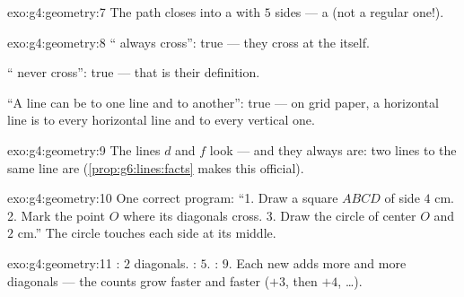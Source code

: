\begin{solution}{exo:g4:geometry:7}
The path closes into a  with $5$ sides --- a  (not a
regular one!).
\end{solution}

\begin{solution}{exo:g4:geometry:8}
`` always cross'': true --- they cross at the
 itself.

`` never cross'': true --- that is their definition.

``A line can be  to one line and  to
another'': true --- on grid paper, a horizontal line is  to
every horizontal line and  to every vertical one.
\end{solution}

\begin{solution}{exo:g4:geometry:9}
The lines $d$ and $f$ look  --- and they always are: two
lines  to the same line are 
(\cref{prop:g6:lines:facts} makes this official).
\end{solution}

\begin{solution}{exo:g4:geometry:10}
One correct program: ``1. Draw a square $ABCD$ of side $4$ cm.
2. Mark the point $O$ where its diagonals cross. 3. Draw the circle
of center $O$ and  $2$ cm.'' The circle touches each side at
its middle.
\end{solution}

\begin{solution}{exo:g4:geometry:11}
: $2$ diagonals. : $5$. : $9$. Each new
 adds more and more diagonals --- the counts grow faster and
faster ($+3$, then $+4$, \dots).
\end{solution}

